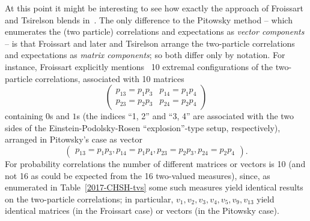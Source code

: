 \documentclass[%
  twocolumn,
 showpacs,
 showkeys,
 preprintnumbers,
 amsmath,amssymb,
 aps,
  pra,
  longbibliography,
 floatfix,
 ]{revtex4-1}
\begin{document}
At this point it might be interesting to see how exactly the approach of  Froissart and Tsirelson blends in~\cite{froissart-81,cirelson}.
The only difference to the Pitowsky method -- which enumerates the (two particle) correlations and expectations as {\em vector components} --
is that
Froissart and later  and Tsirelson arrange the two-particle correlations and expectations as {\em matrix components};
so both differ only by notation.
For instance, Froissart explicitly mentions~\cite[pp.~242,243]{froissart-81} 10 extremal configurations of the two-particle correlations,
associated with 10 matrices
\begin{equation}
\begin{pmatrix}p_{13}=p_1p_3 &p_{14}=p_1p_4 \\p_{23}=p_2p_3 &p_{24}=p_2p_4 \end{pmatrix}
\end{equation}
containing $0$s and $1$s
(the indices ``1, 2'' and ``3, 4'' are associated with the two sides of the Einstein-Podolsky-Rosen ``explosion''-type setup, respectively),
arranged in Pitowsky's case as vector
\begin{equation}
\begin{pmatrix}p_{13}=p_1p_3, p_{14}=p_1p_4, p_{23}=p_2p_3, p_{24}=p_2p_4 \end{pmatrix}.
\end{equation}
For probability correlations the number of different matrices or vectors is 10 (and not 16 as could be expected from the 16 two-valued measures),
since, as enumerated in Table~\ref{2017-CHSH-tvs} some such measures yield identical results on the two-particle correlations; in particular,
$v_1, v_2, v_3, v_4, v_5, v_9, v_{13}$  yield identical matrices (in the Froissart case) or vectors (in the Pitowsky case).
\end{document}
